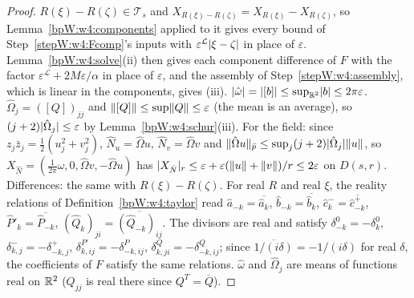 \begin{proof}
\label{stepW:w4:lip}
$R(\xi)-R(\zeta)\in\mathcal T_s$ and $X_{R(\xi)-R(\zeta)}=X_{R(\xi)}-X_{R(\zeta)}$, so Lemma~\ref{bpW:w4:components} applied to
it gives every bound of Step~\ref{stepW:w4:Fcomp}'s inputs with $\varepsilon^{\mathcal L}\lvert \xi-\zeta\rvert$ in place of
$\varepsilon$. Lemma~\ref{bpW:w4:solve}(ii) then gives each component difference of $F$ with the factor
$\varepsilon^{\mathcal L}+2M\varepsilon/\alpha$ in place of $\varepsilon$, and the assembly of Step~\ref{stepW:w4:assembly},
which is linear in the components, gives (iii).
\label{stepW:w4:Nhat}
$\lvert \hat\omega\rvert=\lvert [b]\rvert\le\sup_{\mathbb{R}^2}\lvert b\rvert\le2\pi\varepsilon$. $\hat\Omega_j=([Q])_{jj}$ and $\lVert [Q]\rVert\le\sup\lVert Q\rVert\le\varepsilon$
(the mean is an average), so $(j+2)\lvert \hat\Omega_j\rvert\le\varepsilon$ by Lemma~\ref{bpW:w4:schur}(iii). For the field: since
$z_j\bar z_j=\frac12(u_j^2+v_j^2)$, $\hat N_u=\hat\Omega u$, $\hat N_v=\hat\Omega v$ and
$\lVert \hat\Omega u\rVert_{\bar p}\le\sup_j(j+2)\lvert \hat\Omega_j\rvert\lVert u\rVert$, so $X_{\hat N}=(\frac1{2\pi}\hat\omega,0,\hat\Omega v,-\hat\Omega u)$ has
$\lvert X_{\hat N}\rvert_r\le\varepsilon+\varepsilon(\lVert u\rVert+\lVert v\rVert)/r\le2\varepsilon$ on $D(s,r)$. Differences: the same with
$R(\xi)-R(\zeta)$.
\label{stepW:w4:real}
For real $R$ and real $\xi$, the reality relations of Definition~\ref{bpW:w4:taylor} read
$\hat a_{-k}=\overline{\hat a_k}$, $\hat b_{-k}=\overline{\hat b_k}$, $\hat c^-_{k}=\overline{\hat c^+_{-k}}$,
$\hat P'_k=\overline{\hat P_{-k}}$, $(\hat Q_k)_{ji}=\overline{(\hat Q_{-k})_{ij}}$. The divisors are real and satisfy
$\delta^0_{-k}=-\delta^0_k$, $\delta^-_{k,j}=-\delta^+_{-k,j}$, $\delta^{P'}_{k,ij}=-\delta^P_{-k,ij}$,
$\delta^Q_{k,ji}=-\delta^Q_{-k,ij}$; since $\overline{1/(i\delta)}=-1/(i\delta)$ for real $\delta$, the coefficients of $F$
satisfy the same relations. $\hat\omega$ and $\hat\Omega_j$ are means of functions real on $\mathbb{R}^2$ ($Q_{jj}$ is real there since
$Q^T=\overline Q$).
\end{proof}

